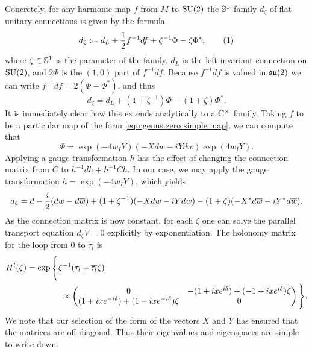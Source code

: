 \documentclass{article}
\begin{document}
Concretely, for any harmonic map $f$ from $M$ to $\SU(2)$ the $\S^1$ family $d_\zeta$ of flat unitary connections is given by the formula
\[
d_\zeta := d_L + \frac{1}{2}f^{-1}df + \zeta^{-1}\Phi - \zeta\Phi^*,
\labelthis{eqn:flat connection translation}
\]
where $\zeta\in\S^1$ is the parameter of the family, $d_L$ is the left invariant connection on $\SU(2)$, and $2\Phi$ is the $(1,0)$ part of $f^{-1}df$. Because $f^{-1}df$ is valued in $\su(2)$ we can write $f^{-1}df = 2(\Phi - \Phi^*)$, and thus
\[
d_\zeta = d_L + (1+\zeta^{-1})\Phi - (1+\zeta)\Phi^*.
\]
It is immediately clear how this extends analytically to a $\C^\times$ family. Taking $f$ to be a particular map of the form \eqref{eqn:genus zero simple map}, we can compute that
\[
\Phi = \exp(-4w_I Y)(-Xdw -iYdw)\exp(4w_I Y).
\]
Applying a gauge transformation $h$ has the effect of changing the connection matrix from $C$ to $h^{-1}dh + h^{-1}Ch$. In our case, we may apply the gauge transformation $h = \exp(-4 w_I Y)$, which yields
\[
d_\zeta = d -\frac{\iu}{2}(dw - d\bar{w}) + (1+\zeta^{-1})(-Xdw -iYdw) - (1+\zeta)(-X^*d\bar{w} -iY^*d\bar{w}).
\]
As the connection matrix is now constant, for each $\zeta$ one can solve the parallel transport equation $d_\zeta V = 0$ explicitly by exponentiation.
The holonomy matrix for the loop from $0$ to $\tau_l$ is
\begin{align*}
H^l(\zeta)
&= \exp \Bigg\{ \zeta^{-1}(\tau_l + \bar{\tau_l}\zeta)  \\
&\hspace{1.5cm}\times\begin{pmatrix}
0 & - (1 + \iu xe^{\iu \delta}) + (-1 + \iu x e^{\iu \delta})\zeta \\
(1+\iu xe^{-\iu \delta}) + (1-\iu xe^{-\iu \delta})\zeta & 0
\end{pmatrix}\Bigg\}.
\end{align*}
We note that our selection of the form of the vectors $X$ and $Y$ has ensured that the matrices are off-diagonal. Thus their eigenvalues and eigenspaces are simple to write down.
\end{document}
